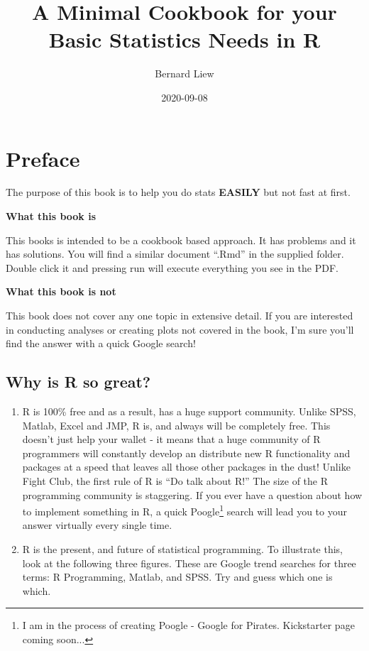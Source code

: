 \documentclass[
]{book}
\title{A Minimal Cookbook for your Basic Statistics Needs in R}
\author{Bernard Liew}
\date{2020-09-08}
\begin{document}
\maketitle

{
\setcounter{tocdepth}{1}
\tableofcontents
}
\hypertarget{intro}{%
\chapter{Preface}\label{intro}}

The purpose of this book is to help you do stats \textbf{EASILY} but not fast at first.

\textbf{What this book is}

This books is intended to be a cookbook based approach. It has problems and it has solutions. You will find a similar document ``.Rmd'' in the supplied folder. Double click it and pressing run will execute everything you see in the PDF.

\textbf{What this book is not}

This book does not cover any one topic in extensive detail. If you are interested in conducting analyses or creating plots not covered in the book, I'm sure you'll find the answer with a quick Google search!

\hypertarget{why-is-r-so-great}{%
\section{Why is R so great?}\label{why-is-r-so-great}}

\begin{enumerate}
\def\labelenumi{\arabic{enumi}.}
\item
  R is 100\% free and as a result, has a huge support community. Unlike SPSS, Matlab, Excel and JMP, R is, and always will be completely free. This doesn't just help your wallet - it means that a huge community of R programmers will constantly develop an distribute new R functionality and packages at a speed that leaves all those other packages in the dust! Unlike Fight Club, the first rule of R is ``Do talk about R!'' The size of the R programming community is staggering. If you ever have a question about how to implement something in R, a quick Poogle\footnote{I am in the process of creating Poogle - Google for Pirates. Kickstarter page coming soon...} search will lead you to your answer virtually every single time.
\item
  R is the present, and future of statistical programming. To illustrate this, look at the following three figures. These are Google trend searches for three terms: R Programming, Matlab, and SPSS. Try and guess which one is which.
\end{enumerate}
\end{document}
